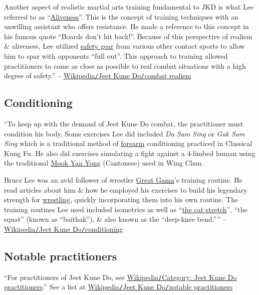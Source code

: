 \documentclass[oneside]{book}
\numberwithin{equation}{section}
\begin{document}
Another aspect of realistic martial arts training fundamental to JKD is what Lee referred to as ``\href{https://en.wikipedia.org/wiki/Aliveness_(martial_arts)}{Aliveness}''. This is the concept of training techniques with an unwilling assistant who offers resistance. He made a reference to this concept in his famous quote ``Boards don't hit back!''. Because of this perspective of realism \& aliveness, Lee utilized \href{https://en.wikipedia.org/wiki/Safety_gear}{safety gear} from various other contact sports to allow him to spar with opponents ``full out''. This approach to training allowed practitioners to come as close as possible to real combat situations with a high degree of safety.'' -- \href{https://en.wikipedia.org/wiki/Jeet_Kune_Do#Combat_realism}{Wikipedia\texttt{/}Jeet Kune Do\texttt{/}combat realism}

\subsection{Conditioning}
``To keep up with the demand of Jeet Kune Do combat, the practitioner must condition his body. Some exercises Lee did included \textit{Da Sam Sing} or \textit{Gak Sam Sing} which is a traditional method of \href{https://en.wikipedia.org/wiki/Forearm}{forearm} conditioning practiced in Classical Kung Fu. He also did exercises simulating a fight against a 4-limbed human using the traditional \href{https://en.wikipedia.org/wiki/Mu_ren_zhuang}{Mook Yan Yong} (Cantonese) used in Wing Chun.

Bruce Lee was an avid follower of wrestler \href{https://en.wikipedia.org/wiki/Great_Gama}{Great Gama}'s training routine. He read articles about him \& how he employed his exercises to build his legendary strength for \href{https://en.wikipedia.org/wiki/Wrestling}{wrestling}, quickly incorporating them into his own routine. The training routines Lee used included isometrics as well as ``\href{https://en.wikipedia.org/wiki/Push-up}{the cat stretch}'', ``the squat'' (known as ``baithak''), \& also known as the ``deep-knee bend.'''' -- \href{https://en.wikipedia.org/wiki/Jeet_Kune_Do#Conditioning}{Wikipedia\texttt{/}Jeet Kune Do\texttt{/}conditioning}

\subsection{Notable practitioners}
``For practitioners of Jeet Kune Do, see \href{https://en.wikipedia.org/wiki/Category:Jeet_Kune_Do_practitioners}{Wikipedia\texttt{/}Category: Jeet Kune Do practitioners}.'' See a list at \href{https://en.wikipedia.org/wiki/Jeet_Kune_Do#Notable_practitioners}{Wikipedia\texttt{/}Jeet Kune Do\texttt{/}notable practitioners}
\end{document}
